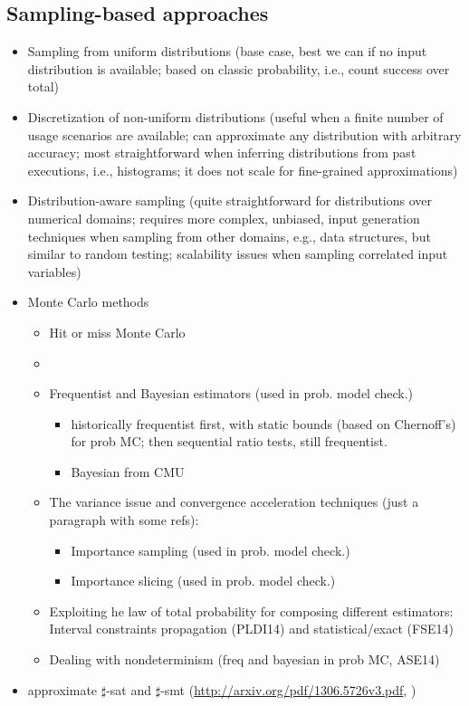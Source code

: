 \subsection{Sampling-based approaches}\label{sec:approximateComputation}
	\begin{itemize}
		\item Sampling from uniform distributions (base case, best we can if no input distribution is available; based on classic probability, i.e., count success over total)
		\item Discretization of non-uniform distributions (useful when a finite number of usage scenarios are available; can approximate any distribution with arbitrary accuracy; most straightforward when inferring distributions from past executions, i.e., histograms; it does not scale for fine-grained approximations)
		\item Distribution-aware sampling (quite straightforward for distributions over numerical domains; requires more complex, unbiased, input generation techniques when sampling from other domains, e.g., data structures, but similar to random testing; scalability issues when sampling correlated input variables)
      
		\item Monte Carlo methods
			\begin{itemize}
				\item Hit or miss Monte Carlo
				\item {}
				\item Frequentist and Bayesian estimators (used in prob. model check.)
					\begin{itemize}
						\item historically frequentist first, with static bounds (based on Chernoff's) for prob MC; then sequential ratio tests, still frequentist.
						\item Bayesian from CMU
					\end{itemize}
				\item The variance issue and convergence acceleration techniques (just a paragraph with some refs):
					\begin{itemize}
						\item Importance sampling (used in prob. model check.)
						\item Importance slicing (used in prob. model check.)
					\end{itemize}

				\item Exploiting he law of total probability for composing different estimators: Interval constraints propagation (PLDI14) and statistical/exact (FSE14)
				\item Dealing with nondeterminism (freq and bayesian in prob MC, ASE14)	
			\end{itemize}
			
			\item approximate $\sharp$-sat and $\sharp$-smt (\url{http://arxiv.org/pdf/1306.5726v3.pdf}, )


		 
	\end{itemize}
